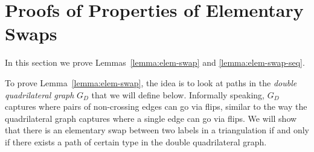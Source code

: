 
\section{Proofs of Properties of Elementary Swaps}
\label{sec:bounds}

In this section we prove Lemmas~\ref{lemma:elem-swap} and \ref{lemma:elem-swap-seq}.

To prove 
Lemma~\ref{lemma:elem-swap}, the idea is to look at paths in the \textit{double quadrilateral graph} $G_D$ that we will define below. Informally speaking, 
$G_D$ captures where pairs of non-crossing edges can go via flips, similar to the way the quadrilateral graph captures where a single edge can go via flips.
We will show that there is an elementary swap between two labels in a triangulation if and only if there exists a path of certain type in the double quadrilateral graph. 

